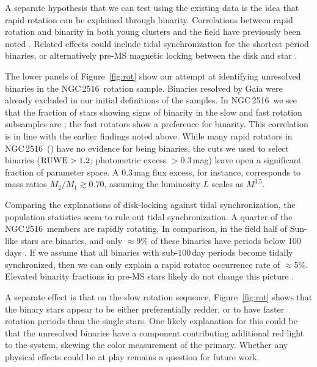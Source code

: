 \documentclass[12pt,twocolumn,tighten]{aastex63}
\newcommand{\cn}{NGC\,2516} %
\begin{document}
A separate hypothesis that we can test using the existing data is the
idea that rapid rotation can be explained through binarity.
Correlations between rapid rotation and binarity in both young
clusters and the field have previously been noted
\citep{meibom_effect_2007,stauffer_rotation_2016,simonian_rapid_2019,gillen_ngts_2020}.
Related effects could include tidal synchronization for the shortest
period binaries, or alternatively pre-MS magnetic locking between the
disk and star \citep[{\it
e.g.},][]{koenigl_disk_1991,long_locking_2005}.

The lower panels of Figure~\ref{fig:rot} show our attempt at identifying
unresolved binaries in the \cn\ rotation sample.  Binaries resolved by
Gaia were already excluded in our initial definitions of the samples.  In
\cn\, we see that the fraction of stars showing signs of binarity in the
slow and fast rotation subsamples are ; the fast rotators show a
preference for binarity.  This correlation is in line with the earlier
findings noted above.  While many rapid rotators in \cn\
() have no evidence for being binaries, the cuts we
used to select binaries (${\rm RUWE}>1.2$; photometric excess
$>$0.3\,mag) leave open a significant fraction of parameter space.  A
0.3\,mag flux excess, for instance, corresponds to mass ratios $M_2/M_1
\gtrsim 0.70$, assuming the luminosity $L$ scales as $M^{3.5}$. 

Comparing the explanations of disk-locking against tidal
synchronization, the population statistics seem to rule out 
tidal synchronization.  A quarter of the \cn\ members
are rapidly rotating.  In comparison, in the field half of Sun-like
stars are binaries, and only $\approx$9\% of these binaries have
periods below 100\,days \citep{raghavan_survey_2010}.  If we assume
that all binaries with sub-100\,day periods become tidally
synchronized, then we can only explain a rapid rotator occurrence rate
of $\approx$5\%.  Elevated binarity fractions in pre-MS stars likely
do not change this picture \citep[see Section~4.4
of][]{duchene_stellar_2013}.

A separate effect is that on the slow rotation sequence,
Figure~\ref{fig:rot} shows that the binary stars appear to be either
preferentially redder, or to have faster rotation periods than the
single stars.  One likely explanation for this could be that the
unresolved binaries have a component contributing additional red light
to the system, skewing the color measurement of the primary.  Whether
any physical effects could be at play remains a question for future
work.
\end{document}
